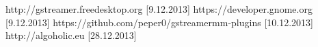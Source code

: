 \documentclass[12pt]{article}
\begin{document}
\cleardoublepage
\begin{thebibliography}{9}

  http://gstreamer.freedesktop.org [9.12.2013]
  https://developer.gnome.org [9.12.2013]
  https://github.com/peper0/gstreamermm-plugins [10.12.2013]
  http://algoholic.eu [28.12.2013]
\end{thebibliography}
\end{document}
